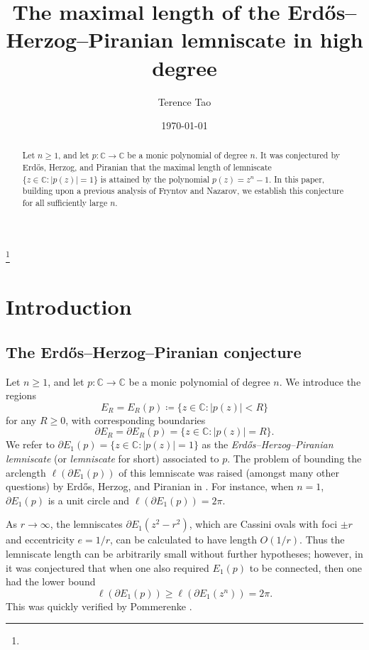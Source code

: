 \documentclass[12pt]{amsart}
\newcommand{\C}{\mathbb{C}}
\begin{document}

\title{The maximal length of the Erd\H{o}s--Herzog--Piranian lemniscate in high degree}

\author[Tao]{Terence Tao}
\address{Department of Mathematics, UCLA, 405 Hilgard Ave, Los Angeles CA 90024}



\keywords{}
\thanks{}


\date{\today}

\begin{abstract} Let $n \geq 1$, and let $p \colon \C \to \C$ be a monic polynomial of degree $n$.  It was conjectured by Erd\H{o}s, Herzog, and Piranian that the maximal length of lemniscate $\{z \in \C: |p(z)| = 1\}$ is attained by the polynomial $p(z) = z^n-1$.  In this paper, building upon a previous analysis of Fryntov and Nazarov, we establish this conjecture for all sufficiently large $n$.
\end{abstract}

\maketitle

\section{Introduction} \label{intro}

\subsection{The Erd\H{o}s--Herzog--Piranian conjecture}

Let $n \geq 1$, and let $p \colon \C \to \C$ be a monic polynomial of degree $n$.  We introduce the regions
$$ E_R = E_R(p) \coloneqq \{ z \in \C: |p(z)| < R \}$$
for any $R \geq 0$, with corresponding boundaries
$$ \partial E_R = \partial E_R(p) = \{ z \in \C: |p(z)| = R \}.$$
We refer to $\partial E_1(p) = \{ z \in \C: |p(z)| = 1 \}$ as the \emph{Erd\H{o}s--Herzog--Piranian lemniscate} (or \emph{lemniscate} for short) associated to $p$.  The problem of bounding the arclength $\ell(\partial E_1(p))$ of this lemniscate was raised (amongst many other questions) by Erd\H{o}s, Herzog, and Piranian in \cite{EHP}.  For instance, when $n=1$, $\partial E_1(p)$ is a unit circle and $\ell(\partial E_1(p)) = 2 \pi$.

As $r \to \infty$, the lemniscates $\partial E_1(z^2-r^2)$, which are Cassini ovals with foci $\pm r$ and eccentricity $e=1/r$, can be calculated to have length $O(1/r)$.  Thus the lemniscate length can be arbitrarily small without further hypotheses; however, in \cite[Problem 12]{EHP} it was conjectured that when one also required $E_1(p)$ to be connected, then one had the lower bound
$$ \ell(\partial E_1(p)) \geq \ell(\partial E_1(z^n)) = 2\pi.$$
This was quickly verified by Pommerenke \cite{pommerenke59}.
\end{document}
